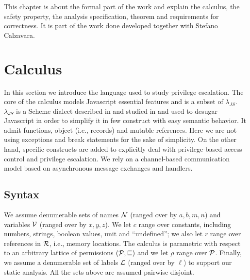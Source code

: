 This chapter is about the formal part of the work and explain the calculus, the safety property, the analysis specification, theorem and requirements for correctness. It is part of the work done developed together with Stefano Calzavara.

\section{Calculus}
\label{sec:Calculus}
In this section we introduce the language used to study privilege escalation. The core of the calculus models Javascript essential features and is a subset of $\lambda_{JS}$. $\lambda_{JS}$ is a Scheme dialect described in \cite{LambdaJS} and studied in \cite{Strobe} and \cite{LambdaJSMightVanHorn} used to desugar Javascript in order to simplify it in few construct with easy semantic behavior. It admit functions, object (i.e., records) and mutable references. Here we are not using exceptions and break statements for the sake of simplicity. On the other hand, specific constructs are added to explicitly deal with privilege-based access control and privilege escalation. We rely on a channel-based communication model based on asynchronous message exchanges and handlers. 

\subsection{Syntax}
We assume denumerable sets of names $\mathcal{N}$ (ranged over by $a,b,m,n$) and variables $\mathcal{V}$ (ranged over by $x,y,z$). We let $c$ range over constants, including numbers, strings, boolean values, unit and ``undefined''; we also let $r$ range over references in $\mathcal{R}$, i.e., memory locations. The calculus is parametric with respect to an arbitrary lattice of permissions $(\mathcal{P},\sqsubseteq)$ and we let $\rho$ range over $\mathcal{P}$. Finally, we assume a denumerable set of labels ${\mathcal L}$ (ranged over by $\ell$) to support our static analysis. All the sets above are assumed pairwise disjoint. 

